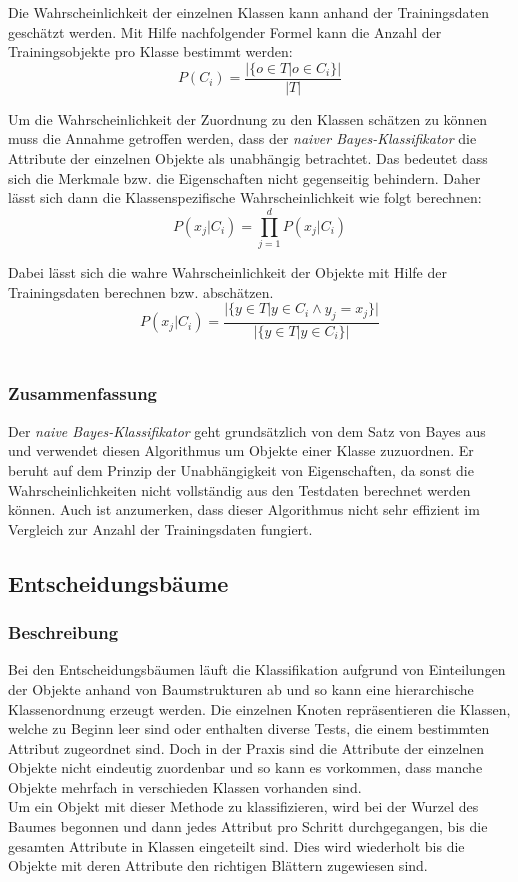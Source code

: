 Die Wahrscheinlichkeit der einzelnen Klassen kann anhand der Trainingsdaten geschätzt werden. Mit Hilfe nachfolgender Formel kann die Anzahl der Trainingsobjekte pro Klasse bestimmt werden:\\


\[P(C_i) = \frac{|\{o \in T| o \in C_i\}|}{|T|}\] 

Um die Wahrscheinlichkeit der Zuordnung zu den Klassen schätzen zu können muss die Annahme getroffen werden, dass der \textit{naiver Bayes-Klassifikator} die Attribute der einzelnen Objekte als unabhängig betrachtet. Das bedeutet dass sich die Merkmale bzw. die Eigenschaften nicht gegenseitig behindern. Daher lässt sich dann die Klassenspezifische Wahrscheinlichkeit wie folgt berechnen:\\


\[P(x_j|C_i) = \prod_{j=1}^d{P(x_j|C_i)}\]

Dabei lässt sich die wahre Wahrscheinlichkeit der Objekte mit Hilfe der Trainingsdaten berechnen bzw. abschätzen.\\


\[P(x_j|C_i) = \frac{|\{y \in T | y \in C_i \wedge y_j = x_j\}|}{|\{y \in T |y \in C_i\}|}\]\\


\cite{brei84,mitch97}
\subsubsection{Zusammenfassung}
Der \textit{naive Bayes-Klassifikator} geht grundsätzlich von dem Satz von Bayes aus und verwendet diesen Algorithmus um Objekte einer Klasse zuzuordnen. Er beruht auf dem Prinzip der Unabhängigkeit von Eigenschaften, da sonst die Wahrscheinlichkeiten nicht vollständig aus den Testdaten berechnet werden können. Auch ist anzumerken, dass dieser Algorithmus nicht sehr effizient im Vergleich zur Anzahl der Trainingsdaten fungiert. \cite{brei84,mitch97}

\subsection{Entscheidungsbäume}
\subsubsection{Beschreibung} 
Bei den Entscheidungsbäumen läuft die Klassifikation aufgrund von Einteilungen der Objekte anhand von Baumstrukturen ab und so kann eine hierarchische Klassenordnung erzeugt werden. Die einzelnen Knoten repräsentieren die Klassen, welche zu Beginn leer sind oder enthalten diverse Tests, die einem bestimmten Attribut zugeordnet sind. Doch in der Praxis sind die  Attribute der einzelnen Objekte nicht eindeutig zuordenbar und so kann es vorkommen, dass manche Objekte mehrfach in verschieden Klassen vorhanden sind. \\
Um ein Objekt mit dieser Methode zu klassifizieren, wird bei der Wurzel des Baumes begonnen und dann jedes Attribut pro Schritt durchgegangen, bis die gesamten Attribute in Klassen eingeteilt sind. Dies wird wiederholt bis die Objekte mit deren Attribute den richtigen Blättern zugewiesen sind.\cite{brei84,mitch97}


